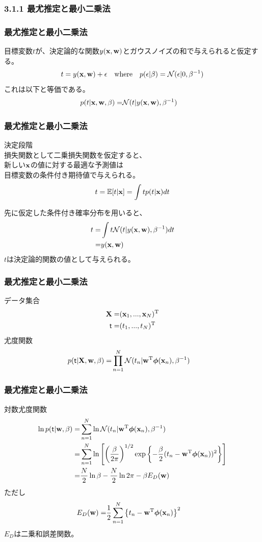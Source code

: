 \documentclass[12pt]{beamer}
\begin{document}
\subsubsection{3.1.1 最尤推定と最小二乗法}

\begin{frame}
  \frametitle{最尤推定と最小二乗法}
  目標変数\(t\)が、決定論的な関数\(y({\rm \bf x},{\rm \bf w})\)とガウスノイズの和で与えられると仮定する。
  \begin{align*}
    t = y({\rm \bf x},{\rm \bf w}) + \epsilon && \text{where} && p(\epsilon|\beta) = {\cal N}(\epsilon|0,\beta^{-1})
  \end{align*}
  これは以下と等価である。
  \begin{align*}
    p(t|{\rm \bf x},{\rm \bf w},\beta) = & {\cal N}(t|y({\rm \bf x},{\rm \bf w}),\beta^{-1})
  \end{align*}
\end{frame}

\begin{frame}
  \frametitle{最尤推定と最小二乗法}
  決定段階 \\[2ex]
  損失関数として二乗損失関数を仮定すると、 \\
  新しい\({\rm \bf x}\)の値に対する最適な予測値は \\
  目標変数の条件付き期待値で与えられる。
  \begin{align*}
    t = {\mathbb{E}}[t|{\rm \bf x}] = \int t p(t|{\rm \bf x}) dt
  \end{align*}

  先に仮定した条件付き確率分布を用いると、
  \begin{align*}
    t = & \int t {\cal N}(t|y({\rm \bf x},{\rm \bf w}),\beta^{-1}) dt \\
      = & y({\rm \bf x},{\rm \bf w})
  \end{align*}
  \(t\)は決定論的関数の値として与えられる。
\end{frame}

\begin{frame}
  \frametitle{最尤推定と最小二乗法}
  データ集合
  \begin{align*}
    {\rm \bf X} = & ({\rm \bf x}_1,...,{\rm \bf x}_N)^{\rm T} \\
    {\bf \mathsf{t}} = & (t_1,...,t_N)^{\rm T}
  \end{align*}
  尤度関数
  \begin{align*}
    p({\bf \mathsf{t}}|{\rm \bf X},{\rm \bf w},\beta) = & \prod_{n=1}^N {\cal N}(t_n|{\rm \bf w}^{\rm T} \boldsymbol \phi({\rm \bf x}_n),\beta^{-1})
  \end{align*}
\end{frame}

\begin{frame}
  \frametitle{最尤推定と最小二乗法}
  対数尤度関数
  \begin{align*}
        \ln p({\bf \mathsf{t}}|{\rm \bf w},\beta)
    = & \sum_{n=1}^N \ln {\cal N}(t_n|{\rm \bf w}^{\rm T} \boldsymbol \phi({\rm \bf x}_n),\beta^{-1}) \\
    = & \sum_{n=1}^N \ln \left[ \left(\frac{\beta}{2 \pi}\right)^{1/2}
        \exp\left\{ -\frac{\beta}{2} (t_n - {\rm \bf w}^{\rm T} \boldsymbol \phi({\rm \bf x}_n))^2 \right\} \right] \\
    = & \frac{N}{2} \ln \beta - \frac{N}{2} \ln 2 \pi - \beta E_D({\rm \bf w})
  \end{align*}
  ただし
  \begin{align*}
    E_D({\rm \bf w}) = & \frac{1}{2} \sum_{n=1}^N \left\{ t_n - {\rm \bf w}^{\rm T} \boldsymbol \phi({\rm \bf x}_n) \right\}^2
  \end{align*}
  \(E_D\)は二乗和誤差関数。
\end{frame}
\end{document}

